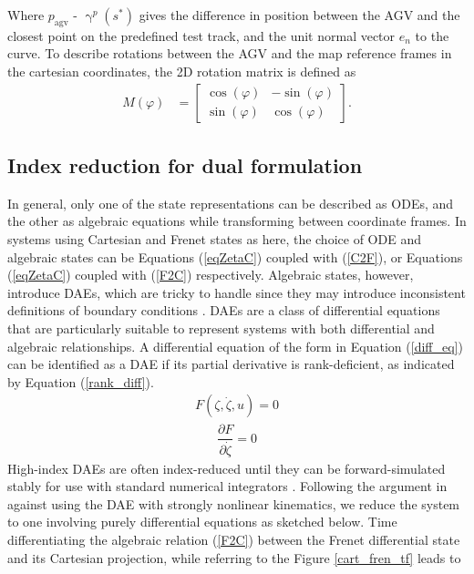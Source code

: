 Where $p_{\mathrm{agv}}$ - $\upgamma^{p}(s^{*})$ gives the difference in position between the \ac{AGV} and the closest point on the predefined test track, and the unit normal vector $e_{n}$ to the curve.
To describe rotations between the \ac{AGV} and the map reference frames in the cartesian coordinates, the 2D rotation matrix is defined as
\begin{align}
    M(\varphi) &=\begin{bmatrix}
        \cos(\varphi) &-\sin(\varphi)\\
        \sin(\varphi) &\cos(\varphi) \label{2D_rot}
    \end{bmatrix}.
\end{align}
\subsection{Index reduction for dual formulation}\label{IdxRed}
In general, only one of the state representations can be described as \ac{ODE}s, and the other as algebraic equations while transforming between coordinate frames. In systems using Cartesian and Frenet states as here, the choice of \ac{ODE} and algebraic states can be Equations (\ref{eqZetaC}) coupled with (\ref{C2F}), or Equations (\ref{eqZetaC}) coupled with (\ref{F2C}) respectively. Algebraic states, however, introduce \ac{DAE}s, which are tricky to handle since they may introduce inconsistent definitions of boundary conditions \cite{campbell_applications_2019}. DAEs are a class of differential equations that are particularly suitable to represent systems with both differential and algebraic relationships. A differential equation of the form in Equation (\ref{diff_eq}) can be identified as a DAE if its partial derivative is rank-deficient, as indicated by Equation (\ref{rank_diff}).
\begin{align}
    F(\zeta, \dot{\zeta}, u) = 0 \label{diff_eq}
\end{align}
\begin{align}
    \dfrac{\partial{F}}{\partial{\dot{\zeta}}} = 0 \label{rank_diff}
\end{align}
High-index \ac{DAE}s are often index-reduced until they can be forward-simulated stably for use with standard numerical integrators \cite{gros_nonlinear_2012}. Following the argument in \cite{reiter_frenet-cartesian_2023} against using the \ac{DAE} with strongly nonlinear kinematics, we reduce the system to one involving purely differential equations as sketched below. Time differentiating the algebraic relation (\ref{F2C}) between the Frenet differential state and its Cartesian projection, while referring to the Figure \ref{cart_fren_tf} leads to
